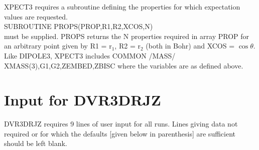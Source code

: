 \documentclass{elsart}
\newcounter{bla}
\begin{document}
XPECT3 requires a subroutine defining the properties for which
expectation values are requested.\\
     SUBROUTINE PROPS(PROP,R1,R2,XCOS,N)\\
must be supplied. PROPS returns the N properties required
in array PROP  for an arbitrary
point given by R1 = r$_1$, R2 = r$_2$ (both in Bohr) and XCOS = $\cos \theta$.
Like DIPOLE3, XPECT3 includes COMMON /MASS/ XMASS(3),G1,G2,ZEMBED,ZBISC
where the variables are as defined above.

\section{Input for DVR3DRJZ}

DVR3DRJZ requires 9 lines of user input for all runs.
Lines giving data not required or
for which the defaults [given below in parenthesis] are sufficient should be
left blank.
\vskip 0.2cm
\end{document}
